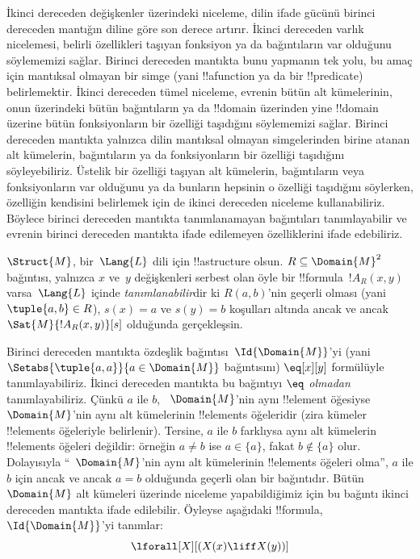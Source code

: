 


\begin{explain}
İkinci dereceden değişkenler üzerindeki niceleme, dilin ifade gücünü birinci
dereceden mantığın diline göre son derece artırır. İkinci dereceden varlık
nicelemesi, belirli özellikleri taşıyan fonksiyon ya da bağıntıların var
olduğunu söylememizi sağlar. Birinci dereceden mantıkta bunu yapmanın tek
yolu, bu amaç için mantıksal olmayan bir simge (yani !!a{function} ya da
bir !!{predicate}) belirlemektir. İkinci dereceden tümel niceleme, evrenin
bütün alt kümelerinin, onun üzerindeki bütün bağıntıların ya da !!{domain}
üzerinden yine !!{domain} üzerine bütün fonksiyonların bir
özelliği taşıdığını söylememizi sağlar. Birinci dereceden mantıkta yalnızca
dilin mantıksal olmayan simgelerinden birine atanan alt kümelerin,
bağıntıların ya da fonksiyonların bir özelliği taşıdığını söyleyebiliriz.
Üstelik bir özelliği taşıyan alt kümelerin, bağıntıların veya fonksiyonların
var olduğunu ya da bunların hepsinin o özelliği taşıdığını söylerken,
özelliğin kendisini belirlemek için de ikinci dereceden niceleme
kullanabiliriz. Böylece birinci dereceden mantıkta tanımlanamayan bağıntıları
tanımlayabilir ve evrenin birinci dereceden mantıkta ifade edilemeyen
özelliklerini ifade edebiliriz.
\end{explain}

\begin{defn}
$\Struct{M}$, bir~$\Lang{L}$ dili için !!a{structure} olsun.
$R \subseteq \Domain{M}^2$ bağıntısı, yalnızca $x$ ve~$y$ değişkenleri
serbest olan öyle bir !!{formula}~$!A_R(x,y)$ varsa~$\Lang{L}$ içinde
\emph{tanımlanabilir}dir ki $R(a,b)$'nin geçerli olması (yani
$\tuple{a,b} \in R$), $s(x)=a$ ve $s(y)=b$ koşulları altında ancak ve ancak
$\Sat{M}{!A_R(x,y)}[s]$ olduğunda gerçekleşsin.
\end{defn}

\begin{ex}
Birinci dereceden mantıkta özdeşlik bağıntısı~$\Id{\Domain{M}}$'yi
(yani $\Setabs{\tuple{a,a}}{a \in \Domain{M}}$ bağıntısını)
$\eq[x][y]$ formülüyle tanımlayabiliriz. İkinci dereceden mantıkta bu
bağıntıyı \emph{$\eq$ olmadan} tanımlayabiliriz. Çünkü $a$ ile $b$,
~$\Domain{M}$'nin aynı !!{element} öğesiyse~$\Domain{M}$'nin aynı alt
kümelerinin !!{element}s öğeleridir (zira kümeler !!{element}s öğeleriyle
belirlenir). Tersine, $a$ ile $b$ farklıysa aynı alt kümelerin !!{element}s
öğeleri değildir: örneğin $a \neq b$ ise $a \in \{a\}$, fakat
$b \notin \{a\}$ olur. Dolayısıyla ``~$\Domain{M}$'nin aynı alt
kümelerinin !!{element}s öğeleri olma'', $a$ ile $b$ için ancak ve ancak
$a=b$ olduğunda geçerli olan bir bağıntıdır. Bütün~$\Domain{M}$ alt kümeleri
üzerinde niceleme yapabildiğimiz için bu bağıntı ikinci dereceden mantıkta
ifade edilebilir. Öyleyse aşağıdaki !!{formula}, $\Id{\Domain{M}}$'yi
tanımlar:
\[
\lforall[X][(X(x) \liff X(y))]
\]
\end{ex}

